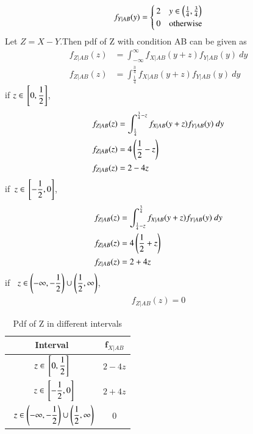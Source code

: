 \documentclass[journal,12pt,twocolumn]{IEEEtran}
\begin{document}
\begin{align}
    f_{Y|AB}(y) = 
    \begin{cases}
    2 & y\in \left(\frac{1}{4},\frac{3}{4}\right)\\
    0 & \text{otherwise}
    \end{cases}
\end{align}
Let $Z=X-Y$.Then pdf of Z with condition AB can be given as
\begin{align}
    f_{Z|AB}(z)&=\int_{-\infty}^{\infty}f_{X|AB}(y+z)f_{Y|AB}(y)~dy\\
    f_{Z|AB}(z)&=\int_{\frac{1}{4}}^{\frac{3}{4}}f_{X|AB}(y+z)f_{Y|AB}(y)~dy
\end{align}
if $z \in {}\left[0,\dfrac{1}{2}\right]$,
\begin{align}
    f_{Z|AB}(z)&=\int_{\frac{1}{4}}^{\frac{3}{4}-z}f_{X|AB}(y+z)f_{Y|AB}(y)~dy\\
       f_{Z|AB}(z)&=4\left(\frac{1}{2}-z\right)\\
       f_{Z|AB}(z)&=2-4z
\end{align}
if$~~z \in {}\left[-\dfrac{1}{2},0\right]$,
\begin{align}
    f_{Z|AB}(z)&=\int_{\frac{1}{4}-z}^{\frac{3}{4}}f_{X|AB}(y+z)f_{Y|AB}(y)~dy\\
       f_{Z|AB}(z)&=4\left(\frac{1}{2}+z\right)\\
       f_{Z|AB}(z)&=2+4z 
\end{align}
if $~~z \in \left(-\infty,-\dfrac{1}{2}\right)\cup \left(\dfrac{1}{2},\infty\right)$,
\begin{align}
    f_{Z|AB}(z)=0
\end{align}
\begin{table}[h]
\centering
\bgroup
\def\arraystretch{2}
\begin{tabular}{|c|c|}
\hline
\textbf{Interval} & ${\boldsymbol f_{X|AB}}$                     \\\hline
$z \in {}\left[0,\dfrac{1}{2}\right]$       & $2-4z$ \\[1ex] \hline
$~~z \in {}\left[-\dfrac{1}{2},0\right]$          & $2+4z$ \\[1ex] \hline
   $~~z \in \left(-\infty,-\dfrac{1}{2}\right)\cup \left(\dfrac{1}{2},\infty\right)$        & $0$ \\[1ex] \hline
\end{tabular}
\egroup
\caption{Pdf of Z in different intervals}
\label{tab:pdf_Z}
\end{table}
\end{document}
